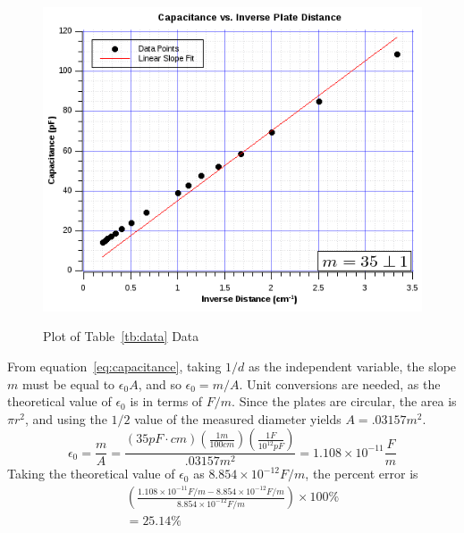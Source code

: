 \documentclass[twocolumn,english]{IEEEtran}
\theoremstyle{plain}
\theoremstyle{plain}
\begin{document}
  \begin{figure}[h!]
  \begin{centering}
  \begin{center}
  \includegraphics[width=\linewidth]{./Pictures/graph1.png}
  \label{fig:graph1}
  \caption{Plot of Table~\ref{tb:data} Data}
  \end{center}
  \par\end{centering}
  \end{figure}

  From equation~\ref{eq:capacitance}, taking $1/d$ as the independent variable, the slope $m$ must be equal to $\epsilon_0 A$, and so $\epsilon_0 = m/A$. Unit conversions are needed, as the theoretical value of $\epsilon_0$ is in terms of $F/m$. Since the plates are circular, the area is $\pi r^2$, and using the $1/2$ value of the measured diameter yields $A=.03157 m^2$.
  \begin{equation*}
   \epsilon_0 = \frac{m}{A} = \frac{ (35 pF\cdot cm) (\frac{1 m}{100 cm})(\frac{1 F}{10^{12} pF})}{.03157 m^2} = 1.108 \times 10^{-11} \frac{F}{m}
  \end{equation*}
  Taking the theoretical value of $\epsilon_0$ as $8.854\times 10^{-12} F/m$, the percent error is
  \begin{align*}
   \left(\frac{1.108\times 10^{-11} F/m - 8.854\times 10^{-12}F/m}{8.854\times 10^{-12}F/m}\right)\times 100\% \\
   = 25.14\%
  \end{align*}
\end{document}
